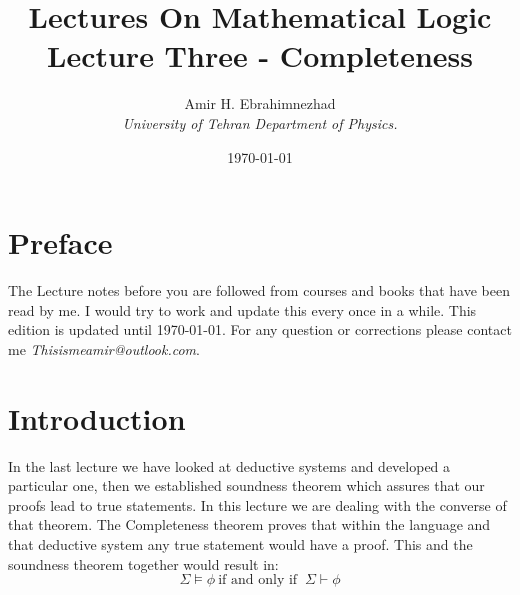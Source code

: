 \documentclass[9pt,a4paper, twocolumn]{article}
\title{Lectures On Mathematical Logic\\ \large Lecture Three - Completeness}
\date{\today}
\author{Amir H. Ebrahimnezhad \\ \small \textit{University of Tehran Department of Physics.}}
\newcounter{theo}
\begin{document}
    \maketitle
    \section*{Preface}
        The Lecture notes before you are followed from courses and books that have been read by me. I would try to work and update this every once in a while. This edition is updated until \today. For any question or corrections please contact me \textit{Thisismeamir@outlook.com}.
    \section*{Introduction}
        In the last lecture we have looked at deductive systems and developed a particular one, then we established soundness theorem which assures that our proofs lead to true statements. In this lecture we are dealing with the converse of that theorem. The Completeness theorem proves that within the language and that deductive system any true statement would have a proof. This and the soundness theorem together would result in:
        \begin{equation}
            \Sigma \vDash \phi \ \text{if and only if } \ \Sigma \vdash \phi
        \end{equation}
\end{document}
